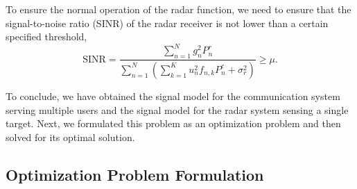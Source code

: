 \documentclass[a4paper,journal,10pt]{IEEEtran}
\begin{document}
To ensure the normal operation of the radar function, we need to ensure that the signal-to-noise ratio (SINR) of the radar receiver is not lower than a certain specified threshold, 
\begin{equation}\label{SINR}
	\mathrm{SINR}= \frac{\sum_{n=1}^{N} g_n^2P_{n}^r}{\sum_{n=1}^{N}(\sum_{k=1}^{K}u_{n}^2f_{n,k}P_{n}^c+\sigma_r^2)} \ge \mu.
\end{equation}

To conclude, we have obtained the signal model for the communication system serving multiple users and the signal model for the radar system sensing a single target. Next, we formulated this problem as an optimization problem and then solved for its optimal solution.

\subsection{Optimization Problem Formulation}
\end{document}
